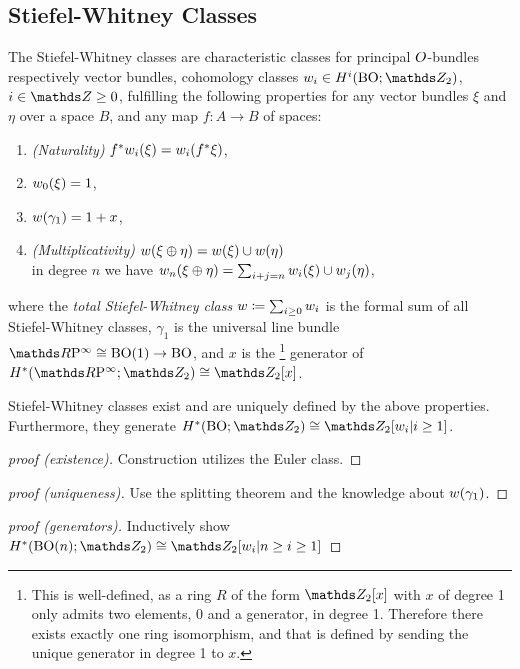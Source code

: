 \subsection{Stiefel-Whitney Classes}
\begin{Def}\label{def:swclasses}
  The Stiefel-Whitney classes are
  characteristic classes for principal $O$-bundles
  respectively vector bundles,
  \idest cohomology classes
  $w_i\in H^i(\BO;\Zmod2)$, $i\in\Z\geq0$,
  fulfilling the following properties for any vector bundles $\xi$ and
  $\eta$ over a space $B$, and any map $f\colon A\to B$ of spaces:
  \begin{enumerate}
  \item \emph{(Naturality)} ${f}^*w_i(\xi) = w_i({f}^* \xi)$,
  \item $w_0(\xi)=1$,
  \item $w(\gamma_1) = 1 + x$,
  \item \emph{(Multiplicativity)} $w(\xi \oplus \eta) = w(\xi)\cup w(\eta)$
    \\\idest in degree $n$ we have
    $w_n(\xi\oplus\eta) = \sum_{i+j=n}w_i(\xi) \cup w_j(\eta)$,
  \end{enumerate}
  where the \emph{total Stiefel-Whitney class}
  $w\coloneqq\sum_{i\geq 0}w_i$ is the formal sum of all
  Stiefel-Whitney classes,
  $\gamma_1$ is the universal line bundle $\RP\cong\BO(1)\to\BO$,
  and $x$ is the%
  \footnote{
    This is well-defined, as a ring $R$ of the form $\Zmod2[x]$
    with $x$ of degree 1 only admits two elements, $0$ and a
    generator, in degree 1. Therefore there exists exactly one ring
    isomorphism, and that is defined by sending the unique generator in
    degree 1 to $x$.
  }
  generator of $H^*(\RP;\Zmod2)\cong\Zmod2[x]$.
\end{Def}

\begin{Thm} %
Stiefel-Whitney classes exist and are uniquely defined by the above
properties. Furthermore, they generate $H^*(\BO;\Zmod2)\cong \Zmod2[\w_i|i\geq1]$.
\begin{proof}[proof (existence)]
  Construction utilizes the Euler class.
\end{proof}
\begin{proof}[proof (uniqueness)]
  Use the splitting theorem and the knowledge about $w(\gamma_1)$.
\end{proof}
\begin{proof}[proof (generators)]
  Inductively show $H^*(\BO(n);\Zmod2)\cong \Zmod2[\w_i|n\geq i\geq1]$
\end{proof}
\end{Thm}

